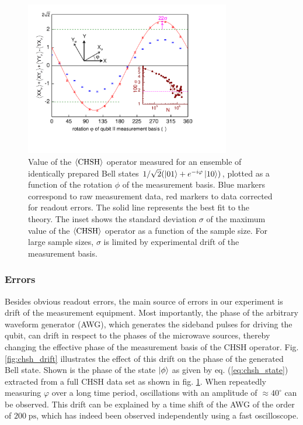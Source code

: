 \begin{figure}[ht!]
	\centering
		\includegraphics[width=0.8\textwidth]{./material/papers/iswap/figures/chsh}
	\caption[]{Value of the $\left< \mathrm{CHSH} \right>$ operator measured for an ensemble of identically prepared Bell states $1/\sqrt{2}(\left| 01 \right>+e^{-i\varphi}\left| 10 \right>)$, plotted as a function of the rotation $\phi$ of the measurement basis. Blue markers correspond to raw measurement data, red markers to data corrected for readout errors. The solid line represents the best fit to the theory. The inset shows the standard deviation $\sigma$ of the maximum value of the $\left< \mathrm{CHSH} \right>$ operator as a function of the sample size. For large sample sizes, $\sigma$ is limited by experimental drift of the measurement basis.}
	\label{fig:chsh}
\end{figure}

\subsubsection{Errors} 

Besides obvious readout errors, the main source of errors in our experiment is drift of the measurement equipment. Most importantly, the phase of the arbitrary waveform generator (AWG), which generates the sideband pulses for driving the qubit, can drift in respect to the phases of the microwave sources, thereby changing the effective phase of the measurement basis of the CHSH operator. Fig. \ref{fig:chsh_drift} illustrates the effect of this drift on the phase of the generated Bell state. Shown is the phase of the state $\left| \phi \right>$ as given by eq. (\ref{eq:chsh_state}) extracted from a full CHSH data set as shown in fig. \ref{fig:chsh}. When repeatedly measuring $\varphi$ over a long time period, oscillations with an amplitude of $\approx 40^\circ$ can be observed. This drift can be explained by a time shift of the AWG of the order of $200\;\mathrm{ps}$, which has indeed been observed independently using a fast oscilloscope.

